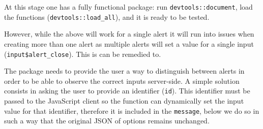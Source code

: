 \documentclass[
]{krantz}
\makeatletter
\newenvironment{Shaded}{\begin{snugshade}}{\end{snugshade}}
\newcommand{\ControlFlowTok}[1]{\textcolor[rgb]{0.27,0.27,0.27}{\textbf{#1}}}
\newcommand{\KeywordTok}[1]{\textcolor[rgb]{0.27,0.27,0.27}{\textbf{#1}}}
\newcommand{\NormalTok}[1]{#1}
\newcommand{\OperatorTok}[1]{\textcolor[rgb]{0.43,0.43,0.43}{\textbf{#1}}}
\newcommand{\StringTok}[1]{\textcolor[rgb]{0.5,0.5,0.5}{#1}}
\newenvironment{kframe}{%
\medskip{}
\setlength{\fboxsep}{.8em}
 \def\at@end@of@kframe{}%
 \ifinner\ifhmode%
  \def\at@end@of@kframe{\end{minipage}}%
  \begin{minipage}{\columnwidth}%
 \fi\fi%
 \def\FrameCommand##1{\hskip\@totalleftmargin \hskip-\fboxsep
 \colorbox{shadecolor}{##1}\hskip-\fboxsep
     \hskip-\linewidth \hskip-\@totalleftmargin \hskip\columnwidth}%
 \MakeFramed {\advance\hsize-\width
   \@totalleftmargin\z@ \linewidth\hsize
   \@setminipage}}%
 {\par\unskip\endMakeFramed%
 \at@end@of@kframe}
\renewenvironment{Shaded}{\begin{kframe}}{\end{kframe}}
\makeatother
\begin{document}
At this stage one has a fully functional package: run \texttt{devtools::document}, load the functions (\texttt{devtools::load\_all}), and it is ready to be tested.

\begin{Shaded}
\end{Shaded}

However, while the above will work for a single alert it will run into issues when creating more than one alert as multiple alerts will set a value for a single input (\texttt{input\$alert\_close}). This is can be remedied to.

The package needs to provide the user a way to distinguish between alerts in order to be able to observe the correct inputs server-side.
A simple solution consists in asking the user to provide an identifier (\texttt{id}). This identifier must be passed to the JavaScript client so the function can dynamically set the input value for that identifier, therefore it is included in the \texttt{message}, below we do so in such a way that the original JSON of options remains unchanged.
\end{document}
